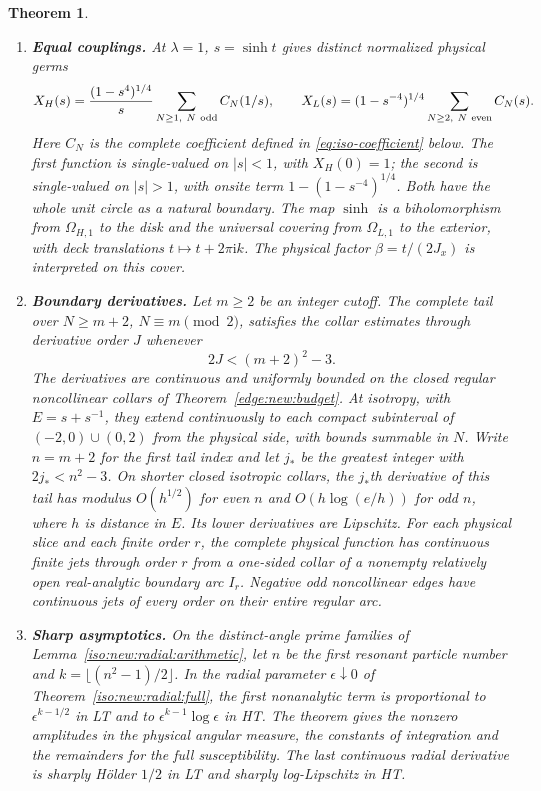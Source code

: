 \documentclass[11pt]{article}
\numberwithin{equation}{section}
\newtheorem{theorem}{Theorem}[section]
\theoremstyle{definition}
\newcommand{\ii}{\mathrm i}
\begin{document}
\begin{theorem}
\begin{enumerate}[label=\textup{(\roman*)},leftmargin=*]
holomorphic on $\Omega_{\nu,\lambda}$ and nonextendable through every
boundary point.
\item \textup{\textbf{Equal couplings.}} At $\lambda=1$, $s=\sinh t$ gives distinct normalized physical germs
\[
 X_H(s)=\frac{(1-s^4)^{1/4}}{s}\sum_{N\ge1,\ N\ {\rm odd}}C_N(1/s),
 \qquad
 X_L(s)=(1-s^{-4})^{1/4}\sum_{N\ge2,\ N\ {\rm even}}C_N(s).
\]
Here $C_N$ is the complete coefficient defined in
\eqref{eq:iso-coefficient} below. The first function is single-valued
on $|s|<1$, with $X_H(0)=1$; the second is single-valued on $|s|>1$,
with onsite term $1-(1-s^{-4})^{1/4}$. Both have the whole unit circle
as a natural boundary. The map $\sinh$ is a biholomorphism from
$\Omega_{H,1}$ to the disk and the universal covering from
$\Omega_{L,1}$ to the exterior, with deck translations
$t\mapsto t+2\pi\ii k$. The physical factor $\beta=t/(2J_x)$ is
interpreted on this cover.
\item \textup{\textbf{Boundary derivatives.}} Let $m\ge2$ be an integer cutoff. The complete tail over
$N\ge m+2$, $N\equiv m\pmod2$, satisfies the collar estimates
through derivative order $J$ whenever
\begin{equation}
                 2J<(m+2)^2-3.
                 \label{eq:common-budget}
\end{equation}
The derivatives are continuous and uniformly bounded on the closed
regular noncollinear collars of Theorem~\ref{edge:new:budget}.
At isotropy, with $E=s+s^{-1}$, they extend continuously to each compact
subinterval of $(-2,0)\cup(0,2)$ from the physical side, with bounds
summable in $N$. Write $n=m+2$ for the first tail index and let $j_*$
be the greatest integer with $2j_*<n^2-3$. On shorter closed isotropic
collars, the $j_*$th derivative of this tail has modulus $O(h^{1/2})$
for even $n$ and $O(h\log(e/h))$ for odd $n$, where $h$ is distance
in $E$. Its lower derivatives are Lipschitz.
For each physical slice and each finite order $r$, the complete
physical function has continuous finite jets through order $r$ from a
one-sided collar of a nonempty relatively open real-analytic boundary
arc $I_r$. Negative odd noncollinear edges have continuous jets of
every order on their entire regular arc.
\item \textup{\textbf{Sharp asymptotics.}} On the distinct-angle prime families of
Lemma~\ref{iso:new:radial:arithmetic}, let $n$ be the first resonant
particle number and $k=\lfloor(n^2-1)/2\rfloor$. In the radial
parameter $\epsilon\downarrow0$ of Theorem~\ref{iso:new:radial:full},
the first nonanalytic term is proportional to $\epsilon^{k-1/2}$
in LT and to $\epsilon^{k-1}\log\epsilon$ in HT. The theorem gives
the nonzero amplitudes in the physical angular measure, the constants
of integration and the remainders for the full susceptibility.
The last continuous radial derivative is sharply H\"older $1/2$
in LT and sharply log-Lipschitz in HT.


\end{enumerate}
\end{theorem}
\end{document}
